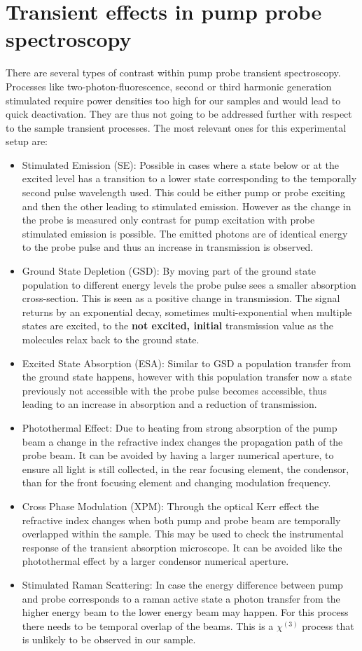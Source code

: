 \documentclass[twoside,openright]{scrreprt}
\begin{document}
\section{Transient effects in pump probe spectroscopy}
There are several types of contrast within pump probe transient spectroscopy. Processes like two-photon-fluorescence, second or third harmonic generation stimulated require power densities too high for our samples and would lead to quick deactivation. They are thus not going to be addressed further with respect to the sample transient processes. The most relevant ones for this experimental setup are:\cite{Zhu2020}
\begin{itemize}
\item Stimulated Emission (SE): Possible in cases where a state below or at the  excited level has a transition to a lower state corresponding to the temporally second pulse wavelength used. This could be either pump or probe exciting and then the other leading to stimulated emission. However as the change in the probe is measured only contrast for pump excitation with probe stimulated emission is possible. The emitted photons are of identical energy to the probe pulse and thus an increase in transmission is observed.
\item Ground State Depletion (GSD): By moving part of the ground state population to different energy levels the probe pulse sees a smaller absorption cross-section. This is seen as a positive change in transmission. The signal returns by an exponential decay, sometimes multi-exponential when multiple states are excited, to the \textbf{not excited, initial} transmission value as the molecules relax back to the ground state.
\item Excited State Absorption (ESA): Similar to GSD a population transfer from the ground state happens, however with this population transfer now a state previously not accessible with the probe pulse becomes accessible, thus leading to an increase in absorption and a reduction of transmission.
\item Photothermal Effect: Due to heating from strong absorption of the pump beam a change in the refractive index changes the propagation path of the probe beam. It can be avoided by having a larger numerical aperture, to ensure all light is still collected, in the rear focusing element, the condensor, than for the front focusing element and changing modulation frequency.
\item Cross Phase Modulation (XPM): Through the optical Kerr effect the refractive index changes when both pump and probe beam are temporally overlapped within the sample. This may be used to check the instrumental response of the transient absorption microscope. It can be avoided like the photothermal effect by a larger condensor numerical aperture.
\item Stimulated Raman Scattering: In case the energy difference between pump and probe corresponds to a raman active state a photon transfer from the higher energy beam to the lower energy beam may happen. For this process there needs to be temporal overlap of the beams. This is a $\chi^{\left(3\right)}$ process that is unlikely to be observed in our sample.\cite{Prince2017}
\end{itemize}
\end{document}

